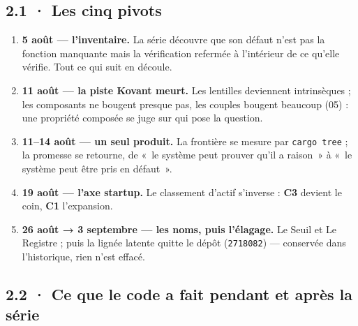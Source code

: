 \documentclass[10pt]{article}
\newcommand{\code}[1]{\texttt{\small #1}}
\newcommand{\ctrois}{\textcolor{c3col}{\textbf{C3}}}
\newcommand{\cun}{\textcolor{c1col}{\textbf{C1}}}
\begin{document}
\subsection{2.1 · Les cinq pivots}

\begin{enumerate}[leftmargin=1.4em,itemsep=1pt,topsep=2pt]
\item \textbf{5 août --- l'inventaire.} La série découvre que son défaut n'est pas la fonction manquante mais la
vérification refermée à l'intérieur de ce qu'elle vérifie. Tout ce qui suit en découle.
\item \textbf{11 août --- la piste Kovant meurt.} Les lentilles deviennent intrinsèques ; les composants ne bougent
presque pas, les couples bougent beaucoup (05) : une propriété composée se juge sur qui pose la question.
\item \textbf{11–14 août --- un seul produit.} La frontière se mesure par \code{cargo tree} ; la promesse se retourne,
de «~le système peut prouver qu'il a raison~» à «~le système peut être pris en défaut~».
\item \textbf{19 août --- l'axe startup.} Le classement d'actif s'inverse : \ctrois{} devient le coin, \cun{}
l'expansion.
\item \textbf{26 août → 3 septembre --- les noms, puis l'élagage.} Le Seuil et Le Registre ; puis la lignée latente
quitte le dépôt (\code{2718082}) --- conservée dans l'historique, rien n'est effacé.
\end{enumerate}

\subsection{2.2 · Ce que le code a fait pendant et après la série}
\end{document}
